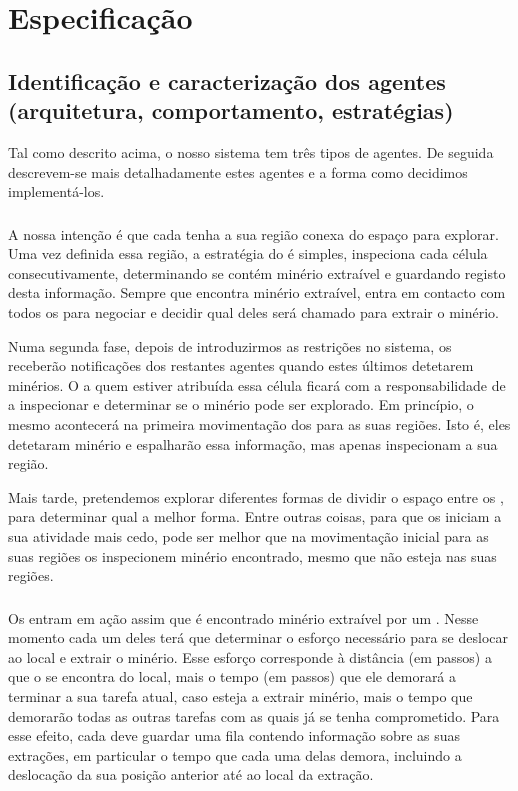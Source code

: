 \documentclass[12pt]{report}
\begin{document}
\chapter{Especificação}

\section{Identificação e caracterização dos agentes (arquitetura, comportamento, estratégias)}

Tal como descrito acima, o nosso sistema tem três tipos de agentes. De seguida descrevem-se mais detalhadamente estes agentes e a forma como decidimos implementá-los.

\subsection{\Spotter}
A nossa intenção é que cada \spotter tenha a sua região conexa do espaço para explorar. Uma vez definida essa região, a estratégia do \Spotter é simples, inspeciona cada célula consecutivamente, determinando se contém minério extraível e guardando registo desta informação. Sempre que encontra minério extraível, entra em contacto com todos os \producers para negociar e decidir qual deles será chamado para extrair o minério.

Numa segunda fase, depois de introduzirmos as restrições no sistema, os \spotters receberão notificações dos restantes agentes quando estes últimos detetarem minérios. O \spotter a quem estiver atribuída essa célula ficará com a responsabilidade de a inspecionar e determinar se o minério pode ser explorado. Em princípio, o mesmo acontecerá na primeira movimentação dos \spotters para as suas regiões. Isto é, eles detetaram minério e espalharão essa informação, mas apenas inspecionam a sua região.

Mais tarde, pretendemos explorar diferentes formas de dividir o espaço entre os \spotters, para determinar qual a melhor forma. Entre outras coisas, para que os \producers iniciam a sua atividade mais cedo, pode ser melhor que na movimentação inicial para as suas regiões os \spotters inspecionem minério encontrado, mesmo que não esteja nas suas regiões.

\subsection{\Producer}
Os \producers entram em ação assim que é encontrado minério extraível por um \spotter. Nesse momento cada um deles terá que determinar o esforço necessário para se deslocar ao local e extrair o minério. Esse esforço corresponde à distância (em passos) a que o \producer se encontra do local, mais o tempo (em passos) que ele demorará a terminar a sua tarefa atual, caso esteja a extrair minério, mais o tempo que demorarão todas as outras tarefas com as quais já se tenha comprometido. Para esse efeito, cada \producer deve guardar uma fila contendo informação sobre as suas extrações, em particular o tempo que cada uma delas demora, incluindo a deslocação da sua posição anterior até ao local da extração.
\end{document}
